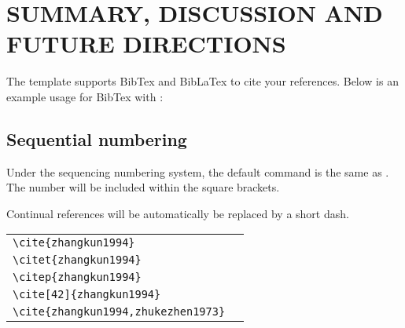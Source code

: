 
\chapter{SUMMARY, DISCUSSION AND FUTURE DIRECTIONS}

The template supports BibTex and BibLaTex to cite your references. Below is an example usage for BibTex with :


\section{Sequential numbering}

Under the sequencing numbering system, the default  command is the same as . The number will be included within the square brackets.

Continual references will be automatically be replaced by a short dash.

\begin{tabular}{l@{\quad$\Rightarrow$\quad}l}
  \verb|\cite{zhangkun1994}|               & \cite{zhangkun1994}               \\
  \verb|\citet{zhangkun1994}|              & \citet{zhangkun1994}              \\
  \verb|\citep{zhangkun1994}|              & \citep{zhangkun1994}              \\
  \verb|\cite[42]{zhangkun1994}|           & \cite[42]{zhangkun1994}           \\
  \verb|\cite{zhangkun1994,zhukezhen1973}| & \cite{zhangkun1994,zhukezhen1973} \\
\end{tabular}





